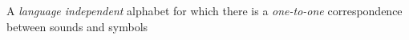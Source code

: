 A \emph{language independent} alphabet for which there is a \emph{one-to-one} correspondence between sounds and symbols
